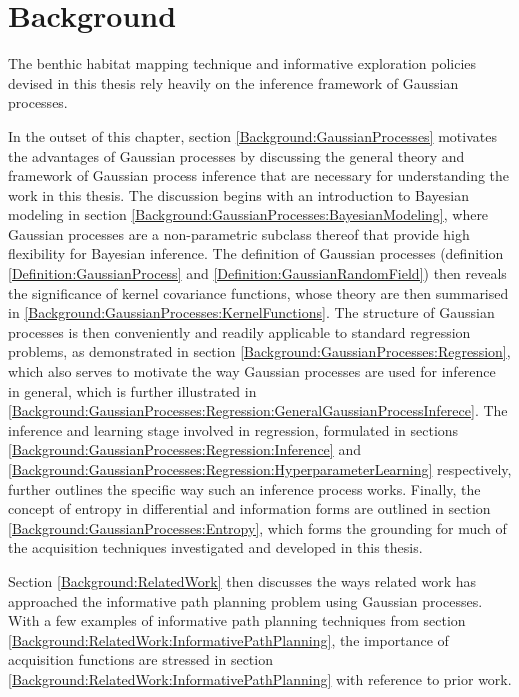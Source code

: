 \chapter{Background}
\label{Background}

	The benthic habitat mapping technique and informative exploration policies devised in this thesis rely heavily on the inference framework of Gaussian processes. 
	
	In the outset of this chapter, section \ref{Background:GaussianProcesses} motivates the advantages of Gaussian processes by discussing the general theory and framework of Gaussian process inference that are necessary for understanding the work in this thesis. The discussion begins with an introduction to Bayesian modeling in section \ref{Background:GaussianProcesses:BayesianModeling}, where Gaussian processes are a non-parametric subclass thereof that provide high flexibility for Bayesian inference. The definition of Gaussian processes (definition \ref{Definition:GaussianProcess} and \ref{Definition:GaussianRandomField}) then reveals the significance of kernel covariance functions, whose theory are then summarised in \ref{Background:GaussianProcesses:KernelFunctions}. The structure of Gaussian processes is then conveniently and readily applicable to standard regression problems, as demonstrated in section \ref{Background:GaussianProcesses:Regression}, which also serves to motivate the way Gaussian processes are used for inference in general, which is further illustrated in \ref{Background:GaussianProcesses:Regression:GeneralGaussianProcessInferece}. The inference and learning stage involved in regression, formulated in sections \ref{Background:GaussianProcesses:Regression:Inference} and \ref{Background:GaussianProcesses:Regression:HyperparameterLearning} respectively, further outlines the specific way such an inference process works. Finally, the concept of entropy in differential and information forms are outlined in section \ref{Background:GaussianProcesses:Entropy}, which forms the grounding for much of the acquisition techniques investigated and developed in this thesis.
	
	
	Section \ref{Background:RelatedWork} then discusses the ways related work has approached the informative path planning problem using Gaussian processes. With a few examples of informative path planning techniques from section \ref{Background:RelatedWork:InformativePathPlanning}, the importance of acquisition functions are stressed in section \ref{Background:RelatedWork:InformativePathPlanning} with reference to prior work.
	

